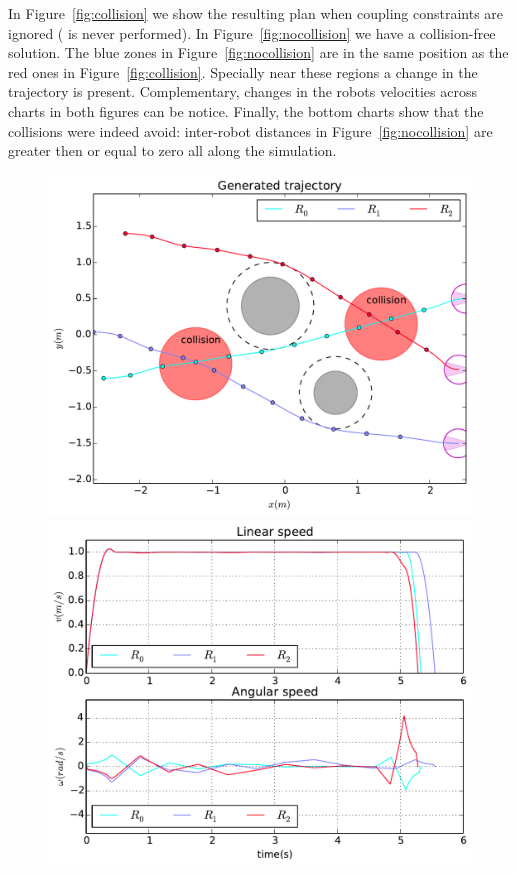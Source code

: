 \documentclass[eprint]{actapoly}
\begin{document}
In Figure~\ref{fig:collision} we show the resulting plan when coupling constraints
are ignored ( is never performed). In Figure~\ref{fig:nocollision}
we have a collision-free solution. The blue zones in Figure~\ref{fig:nocollision} are in the same position as the red ones in Figure~\ref{fig:collision}. Specially near these regions a change in the trajectory is present. Complementary, changes in the robots velocities across charts in both figures can be notice. Finally, the bottom charts show that the collisions were indeed avoid: inter-robot distances in Figure~\ref{fig:nocollision} are greater then or equal to zero all along the simulation.


\begin{figure}[!h]\centering
  \includegraphics[width=\linewidth]{./images/collision/multirobot-path.pdf} %
  \\[1mm]
  \includegraphics[width=\linewidth]{./images/collision/multirobot-vw.pdf} %

\end{figure}
\end{document}
